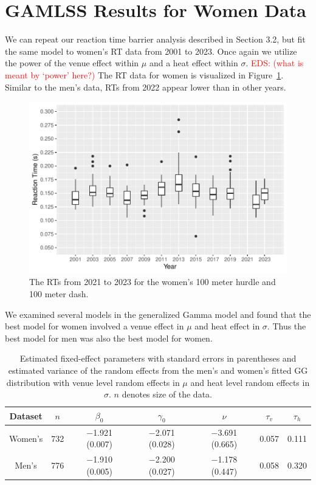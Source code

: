 \documentclass[12pt, letterpaper]{article}
\newcommand{\eds}[1]{\textcolor{red}{EDS: (#1)}}
\begin{document}
\section{GAMLSS Results for Women Data}

We can repeat our reaction time barrier analysis described in Section 3.2, but
fit the same model to women's RT data from 2001 to 2023.  Once again we utilize
the power of the venue effect within $\mu$ and a heat effect within $\sigma$.
\eds{what is meant by `power' here?} 
The RT data for women is visualized in Figure~\ref{fig:WomensBoxplot}.
Similar to the men's data, RTs from 2022 appear lower than in other
years.



\begin{figure}[tbp]
  \centering
  \includegraphics[width=\textwidth]{WomensBoxplot}
  \caption{The RTs from 2021 to 2023 for the women's 100 meter hurdle
  and 100 meter dash.}
  \label{fig:WomensBoxplot}
\end{figure}

We examined several models in the generalized Gamma model and found that the
best model for women involved a venue effect in $\mu$ and heat effect in
$\sigma$.  Thus the best model for men was also the best model for women.

\begin{table}
  \centering
  \caption{Estimated fixed-effect parameters with standard errors in
    parentheses and estimated variance of the random effects from the men's and
    women's fitted GG distribution with venue level random
    effects in $\mu$ and heat level random effects in $\sigma$. $n$ denotes
    size of the data.}
  \label{tab:womensfit}
  \begin{tabular}{c c c c c c c}
    \toprule
    Dataset & $n$ & $\beta_0$ & $\gamma_0$ & $\nu$ & $\tau_v$ & $\tau_h$ \\
    \midrule
    Women's & 732 & $-$1.921 (0.007) & $-$2.071 (0.028) & $-$3.691 (0.665) & 0.057 & 0.111 \\
    Men's & 776 & $-$1.910 (0.005) & $-$2.200 (0.027) & $-$1.178 (0.447) & 0.058 & 0.320 \\
    \bottomrule
  \end{tabular}
\end{table}
\end{document}
